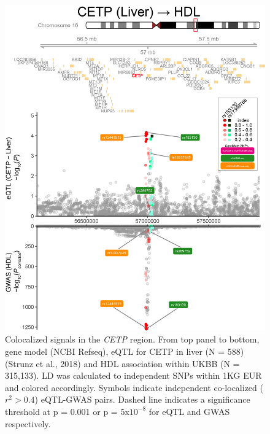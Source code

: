 \documentclass[11pt]{article}
\begin{document}
\begin{figure}[!ht]
  \centering
  \includegraphics[width=.7\textwidth]{figs/region/regionplot.CETP_Liver_HDL_UKBB.20201218.edit.png}
  \caption{Colocalized signals in the \emph{CETP} region. From top
    panel to bottom, gene model (NCBI Refseq), eQTL for CETP in liver
    (N = 588) (Strunz et al., 2018) and HDL association within UKBB (N
    = 315,133). LD was calculated to independent SNPs within 1KG EUR
    and colored accordingly. Symbols indicate independent co-localized
    ($r^2 > 0.4$) eQTL-GWAS pairs. Dashed line indicates a significance
    threshold at p = 0.001 or p = 5x$10^{-8}$ for eQTL and GWAS
    respectively.} 
\end{figure}
\end{document}
